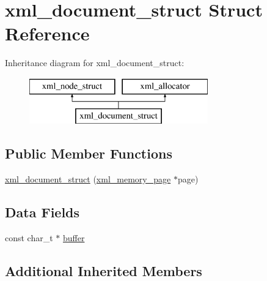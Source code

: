 \hypertarget{structxml__document__struct}{\section{xml\-\_\-document\-\_\-struct Struct Reference}
\label{structxml__document__struct}
}
Inheritance diagram for xml\-\_\-document\-\_\-struct\-:\begin{figure}[H]
\begin{center}
\leavevmode
\includegraphics[height=2.000000cm]{structxml__document__struct}
\end{center}
\end{figure}
\subsection*{Public Member Functions}
\begin{DoxyCompactItemize}
\item 
\hyperlink{structxml__document__struct_aea3482436c20abd98ca063c3bd5dcfba}{xml\-\_\-document\-\_\-struct} (\hyperlink{structxml__memory__page}{xml\-\_\-memory\-\_\-page} $\ast$page)
\end{DoxyCompactItemize}
\subsection*{Data Fields}
\begin{DoxyCompactItemize}
\item 
const char\-\_\-t $\ast$ \hyperlink{structxml__document__struct_a120451f29b8cc2a82a3ecc926449ea0e}{buffer}
\end{DoxyCompactItemize}
\subsection*{Additional Inherited Members}


